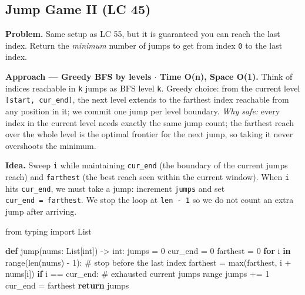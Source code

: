 \documentclass[11pt]{article}
\newenvironment{Shaded}{\begin{snugshade}}{\end{snugshade}}
\newcommand{\BuiltInTok}[1]{\textcolor[rgb]{0.50,0.55,0.55}{#1}}
\newcommand{\CommentTok}[1]{\textcolor[rgb]{0.48,0.49,0.49}{#1}}
\newcommand{\ControlFlowTok}[1]{\textcolor[rgb]{0.99,0.74,0.29}{\textbf{#1}}}
\newcommand{\DecValTok}[1]{\textcolor[rgb]{0.96,0.45,0.00}{#1}}
\newcommand{\ImportTok}[1]{\textcolor[rgb]{0.15,0.68,0.38}{#1}}
\newcommand{\KeywordTok}[1]{\textcolor[rgb]{0.81,0.81,0.76}{\textbf{#1}}}
\newcommand{\NormalTok}[1]{\textcolor[rgb]{0.81,0.81,0.76}{#1}}
\newcommand{\OperatorTok}[1]{\textcolor[rgb]{0.81,0.81,0.76}{#1}}
\begin{document}
\subsection{Jump Game II (LC 45)}\label{jump-game-ii-lc-45}

\textbf{Problem.} Same setup as LC 55, but it is guaranteed you can reach the last index. Return the \emph{minimum} number of jumps to get from index \texttt{0} to the last index.

\textbf{Approach --- Greedy BFS by levels \(\cdot\) Time O(n), Space O(1).} Think of indices reachable in \texttt{k} jumps as BFS level \texttt{k}. Greedy choice: from the current level \texttt{{[}start,\ cur\_end{]}}, the next level extends to the farthest index reachable from any position in it; we commit one jump per level boundary. \emph{Why safe:} every index in the current level needs exactly the same jump count; the farthest reach over the whole level is the optimal frontier for the next jump, so taking it never overshoots the minimum.

\textbf{Idea.} Sweep \texttt{i} while maintaining \texttt{cur\_end} (the boundary of the current jump\textquotesingle s reach) and \texttt{farthest} (the best reach seen within the current window). When \texttt{i} hits \texttt{cur\_end}, we must take a jump: increment \texttt{jumps} and set \texttt{cur\_end\ =\ farthest}. We stop the loop at \texttt{len\ -\ 1} so we do not count an extra jump after arriving.


\begin{Shaded}
\begin{Highlighting}[]
\ImportTok{from}\NormalTok{ typing }\ImportTok{import}\NormalTok{ List}

\KeywordTok{def}\NormalTok{ jump(nums: List[}\BuiltInTok{int}\NormalTok{]) }\OperatorTok{{-}\textgreater{}} \BuiltInTok{int}\NormalTok{:}
\NormalTok{    jumps }\OperatorTok{=} \DecValTok{0}
\NormalTok{    cur\_end }\OperatorTok{=} \DecValTok{0}
\NormalTok{    farthest }\OperatorTok{=} \DecValTok{0}
    \ControlFlowTok{for}\NormalTok{ i }\KeywordTok{in} \BuiltInTok{range}\NormalTok{(}\BuiltInTok{len}\NormalTok{(nums) }\OperatorTok{{-}} \DecValTok{1}\NormalTok{):           }\CommentTok{\# stop before the last index}
\NormalTok{        farthest }\OperatorTok{=} \BuiltInTok{max}\NormalTok{(farthest, i }\OperatorTok{+}\NormalTok{ nums[i])}
        \ControlFlowTok{if}\NormalTok{ i }\OperatorTok{==}\NormalTok{ cur\_end:                     }\CommentTok{\# exhausted current jump\textquotesingle{}s range}
\NormalTok{            jumps }\OperatorTok{+=} \DecValTok{1}
\NormalTok{            cur\_end }\OperatorTok{=}\NormalTok{ farthest}
    \ControlFlowTok{return}\NormalTok{ jumps}
\end{Highlighting}
\end{Shaded}
\end{document}
